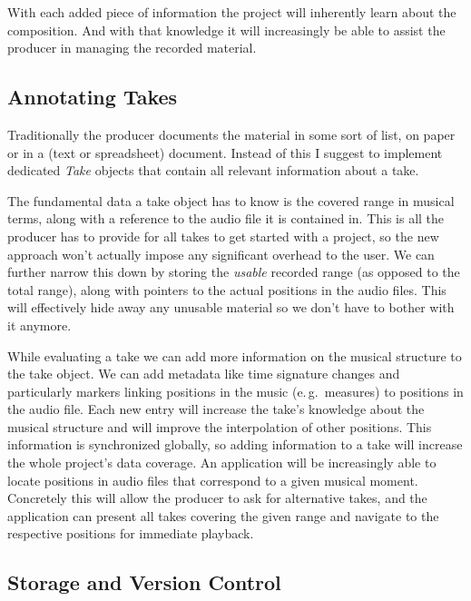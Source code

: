 \documentclass[11pt,a4paper]{article}
\begin{document}
With each added piece of information the project will inherently learn about the composition.
And with that knowledge it will increasingly be able to assist the producer in managing the recorded material.

\subsection{Annotating Takes}
Traditionally the producer documents the material in some sort of list, on paper or in a (text or spreadsheet) document.
Instead of this I suggest to implement dedicated \emph{Take} objects that contain all relevant information about a take.

The fundamental data a take object has to know is the covered range in musical terms, along with a reference to the audio file it is contained in.
This is all the producer has to provide for all takes to get started with a project, so the new approach won't actually impose any significant overhead to the user.
We can further narrow this down by storing the \emph{usable} recorded range (as opposed to the total range), along with pointers to the actual positions in the audio files.
This will effectively hide away any unusable material so we don't have to bother with it anymore.

While evaluating a take we can add more information on the musical structure to the take object.
We can add metadata like time signature changes and particularly markers linking positions in the music (e.\,g.\ measures) to positions in the audio file.
Each new entry will increase the take's knowledge about the musical structure and will improve the interpolation of other positions.
This information is synchronized globally, so adding information to a take will increase the whole project's data coverage.
An application will be increasingly able to locate positions in audio files that correspond to a given musical moment.
Concretely this will allow the producer to ask for alternative takes, and the application can present all takes covering the given range and navigate to the respective positions for immediate playback.

\subsection{Storage and Version Control}
\end{document}
